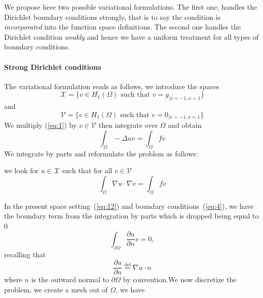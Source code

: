 We propose here two possible variational formulations. The first one,
handles the Dirichlet boundary conditions strongly, that is to say the
condition is \emph{incorporated} into the function space definitions.
The second one handles the Dirichlet condition \emph{weakly} and hence
we have a uniform treatment for all types of boundary conditions.



\paragraph{Strong Dirichlet conditions}
\label{sec:strong-dirichl-cond}

\noindent
The variational formulation reads as follows, we introduce the spaces
\begin{equation}
  \label{eq:11}
  \mathcal{X} = \Big\{ v \in H_1(\Omega) \text{ such that } v=g_{|x=-1,x=1} \Big\}
\end{equation}
and
\begin{equation}
  \label{eq:12}
  \mathcal{V} = \Big\{ v \in H_1(\Omega) \text{ such that } v=0_{|x=-1,x=1} \Big\}
\end{equation}
We multiply (\ref{eq:1}) by $v \in \mathcal{V}$ then integrate over $\Omega$ and obtain
\begin{equation}
  \label{eq:13}
  \int_\Omega -\Delta u v = \int_\Omega f v
\end{equation}
We integrate by parts and reformulate the problem as follows:
\begin{problem}
we look
for $u \in \mathcal{X}$ such that for all $v \in \mathcal{V}$
\begin{equation}
  \label{eq:14}
  \int_\Omega \nabla u \cdot \nabla v  = \int_\Omega f v
\end{equation}

\end{problem}
In the present space setting~(\ref{eq:12}) and boundary
conditions~(\ref{eq:4}), we have the boundary term from the integration by
parts which is dropped being equal to 0
\begin{equation}
  \label{eq:15}
  \int_{\partial \Omega} \frac{\partial u}{\partial n} v = 0,
\end{equation}
recalling that
\begin{equation}
  \label{eq:21}
  \frac{\partial u}{\partial n} \stackrel{\text{def}}{=} \nabla u \cdot n
\end{equation}
where $n$ is the outward normal to $\partial \Omega$ by convention.We
now discretize the problem, we create a mesh out of $\Omega$, we have
